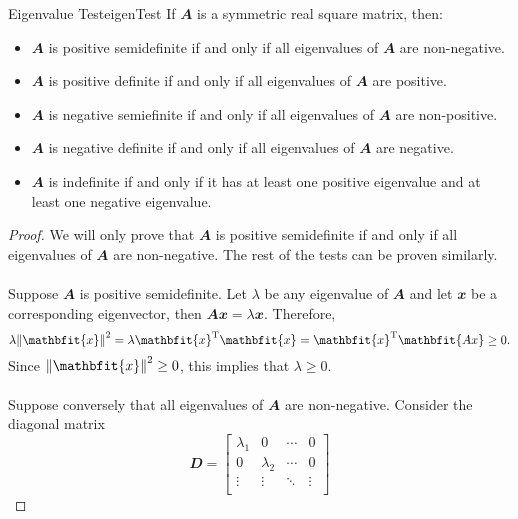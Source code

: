 \documentclass[math, code]{amznotes}
\theoremstyle{remark}
\begin{document}
\begin{thmbox}{Eigenvalue Test}{eigenTest}
    If $\mathbfit{A}$ is a symmetric real square matrix, then:
    \begin{itemize}
        \item $\mathbfit{A}$ is positive semidefinite if and only if all eigenvalues of $\mathbfit{A}$ are non-negative.
        \item $\mathbfit{A}$ is positive definite if and only if all eigenvalues of $\mathbfit{A}$ are positive.
        \item $\mathbfit{A}$ is negative semiefinite if and only if all eigenvalues of $\mathbfit{A}$ are non-positive.
        \item $\mathbfit{A}$ is negative definite if and only if all eigenvalues of $\mathbfit{A}$ are negative.
        \item $\mathbfit{A}$ is indefinite if and only if it has at least one positive eigenvalue and at least one negative eigenvalue.
    \end{itemize}
    \tcblower
    \begin{proof}
        We will only prove that $\mathbfit{A}$ is positive semidefinite if and only if all eigenvalues of $\mathbfit{A}$ are non-negative. The rest of the tests can be proven similarly.
        \\\\
        Suppose $\mathbfit{A}$ is positive semidefinite. Let $\lambda$ be any eigenvalue of $\mathbfit{A}$ and let $\mathbfit{x}$ be a corresponding eigenvector, then $\mathbfit{Ax} = \lambda\mathbfit{x}$. Therefore,
        \begin{equation*}
            \lambda\norm{\mathbfit{x}}^2 = \lambda\mathbfit{x}^{\mathrm{T}}\mathbfit{x} = \mathbfit{x}^{\mathrm{T}}\mathbfit{Ax} \geq 0.
        \end{equation*}
        Since $\norm{\mathbfit{x}}^2 \geq 0$, this implies that $\lambda \geq 0$.
        \\\\
        Suppose conversely that all eigenvalues of $\mathbfit{A}$ are non-negative. Consider the diagonal matrix
        \begin{displaymath}
            \mathbfit{D} = \begin{bmatrix}
                \lambda_1 & 0 & \cdots & 0 \\
                0 & \lambda_2 & \cdots & 0 \\
                \vdots & \vdots & \ddots & \vdots \\

\end{bmatrix}
\end{displaymath}
\end{proof}
\end{thmbox}
\end{document}
